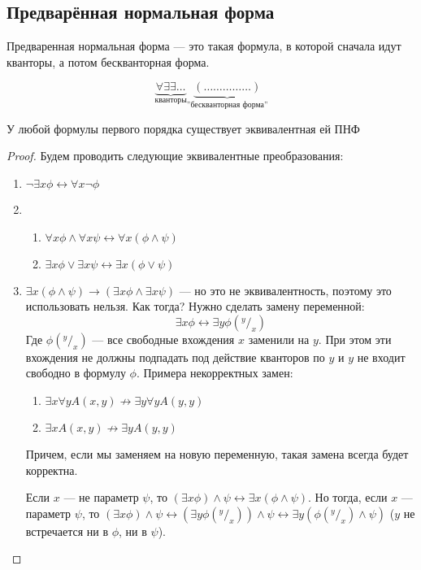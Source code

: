 
\subsection{Предварённая нормальная форма}
\begin{definition}
    Предваренная нормальная форма --- это такая формула, в которой сначала идут кванторы, а потом бескванторная форма.
\end{definition}

$$\underbrace{\forall\exists\exists\dots}_{\text{кванторы}}\underbrace{(\dots\dots\dots\dots\dots)}_{\text{''бескванторная форма''}}$$

\begin{theorem}
    У любой формулы первого порядка существует эквивалентная ей ПНФ
\end{theorem}
\begin{proof}
    Будем проводить следующие эквивалентные преобразования:
    \begin{enumerate}
        \item $\neg \exists x \phi \longleftrightarrow \forall x \neg \phi$
        \item \begin{enumerate}
            \item $\forall x \phi \wedge \forall x \psi \longleftrightarrow \forall x (\phi \wedge \psi)$
            \item $\exists x \phi \vee \exists x \psi \longleftrightarrow \exists x (\phi \vee \psi)$
        \end{enumerate} 
        \item[\cancel{3.}] $\exists x (\phi \wedge \psi) \rightarrow (\exists x\phi \wedge \exists x\psi)$ --- но это не эквивалентность, поэтому это использовать нельзя. Как тогда? Нужно сделать замену переменной:
        $$\exists x \phi \longleftrightarrow \exists y \phi(^y/_x)$$
        Где $\phi(^y/_x)$ --- все свободные вхождения $x$ заменили на $y$. При этом эти вхождения не должны подпадать под действие кванторов по $y$ и $y$ не входит свободно в формулу $\phi$. Примера некорректных замен:
        \begin{enumerate}
            \item $\exists x \forall y A(x, y) \not\rightarrow \exists y \forall y A(y, y)$
            \item $\exists x A(x, y) \not\rightarrow \exists y A(y, y)$
        \end{enumerate}
        Причем, если мы заменяем на новую переменную, такая замена всегда будет корректна.

        Если $x$ --- не параметр $\psi$, то $(\exists x \phi) \wedge \psi \longleftrightarrow \exists x (\phi \wedge \psi)$. Но тогда, если $x$ --- параметр $\psi$, то $(\exists x \phi) \wedge \psi \longleftrightarrow (\exists y \phi(^y/_x)) \wedge \psi \longleftrightarrow \exists y (\phi(^y/_x) \wedge \psi)$ ($y$ не встречается ни в $\phi$, ни в $\psi$).
    \end{enumerate}
\end{proof}

